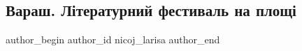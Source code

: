  
 
 
 
 
 
\subsection{Вараш. Літературний фестиваль на площі}
\label{sec:24_06_2021.fb.nicoj_larisa.1.varash_festival_mova_jazyk}
\ifcmt
 author_begin
   author_id nicoj_larisa
 author_end
\fi

